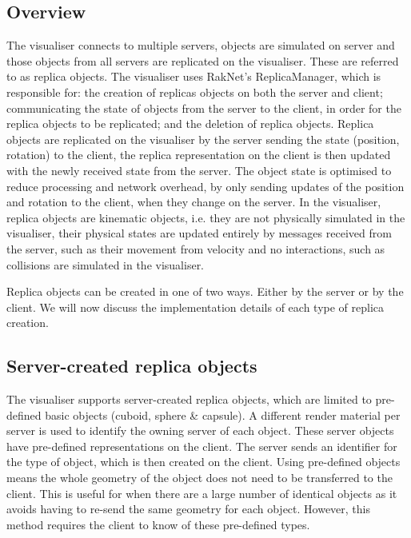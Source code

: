 \subsection{Overview}
The visualiser connects to multiple servers, objects are simulated on server and those objects from all servers are replicated on the visualiser. These are referred to as replica objects. The visualiser uses RakNet's ReplicaManager, which is responsible for: the creation of replicas objects on both the server and client; communicating the state of objects from the server to the client, in order for the replica objects to be replicated; and the deletion of replica objects. Replica objects are replicated on the visualiser by the server sending the state (position, rotation) to the client, the replica representation on the client is then updated with the newly received state from the server. The object state is optimised to reduce processing and network overhead, by only sending updates of the position and rotation to the client, when they change on the server. In the visualiser, replica objects are kinematic objects, i.e. they are not physically simulated in the visualiser, their physical states are updated entirely by messages received from the server, such as their movement from velocity and no interactions, such as collisions are simulated in the visualiser.

Replica objects can be created in one of two ways. Either by the server or by the client. We will now discuss the implementation details of each type of replica creation.

\subsection{Server-created replica objects}
The visualiser supports server-created replica objects, which are limited to pre-defined basic objects (cuboid, sphere \& capsule). A different render material per server is used to identify the owning server of each object. These server objects have pre-defined representations on the client. The server sends an identifier for the type of object, which is then created on the client. Using pre-defined objects means the whole geometry of the object does not need to be transferred to the client. This is useful for when there are a large number of identical objects as it avoids having to re-send the same geometry for each object. However, this method requires the client to know of these pre-defined types.

